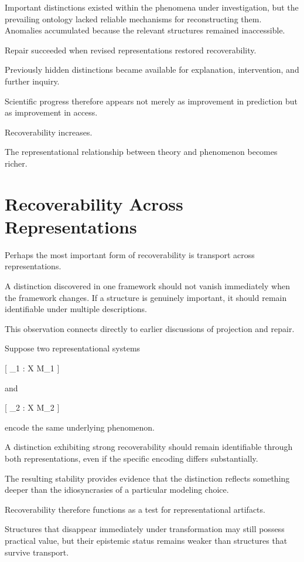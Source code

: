 \documentclass[11pt,oneside,openany]{book}
\begin{document}
Important distinctions existed within the phenomena under investigation, but the prevailing ontology lacked reliable mechanisms for reconstructing them. Anomalies accumulated because the relevant structures remained inaccessible.

Repair succeeded when revised representations restored recoverability.

Previously hidden distinctions became available for explanation, intervention, and further inquiry.

Scientific progress therefore appears not merely as improvement in prediction but as improvement in access.

Recoverability increases.

The representational relationship between theory and phenomenon becomes richer.

\section{Recoverability Across Representations}

Perhaps the most important form of recoverability is transport across representations.

A distinction discovered in one framework should not vanish immediately when the framework changes. If a structure is genuinely important, it should remain identifiable under multiple descriptions.

This observation connects directly to earlier discussions of projection and repair.

Suppose two representational systems

[
\pi_1 : X \rightarrow M_1
]

and

[
\pi_2 : X \rightarrow M_2
]

encode the same underlying phenomenon.

A distinction exhibiting strong recoverability should remain identifiable through both representations, even if the specific encoding differs substantially.

The resulting stability provides evidence that the distinction reflects something deeper than the idiosyncrasies of a particular modeling choice.

Recoverability therefore functions as a test for representational artifacts.

Structures that disappear immediately under transformation may still possess practical value, but their epistemic status remains weaker than structures that survive transport.
\end{document}
